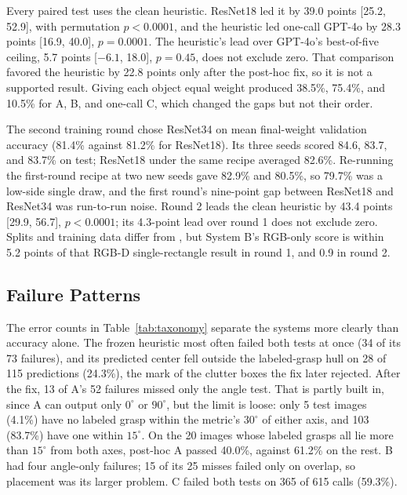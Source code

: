 \documentclass[10pt,conference,compsoc]{IEEEtran}
\begin{document}
Every paired test uses the clean heuristic. ResNet18 led it by 39.0 points
[25.2, 52.9], with permutation $p<0.0001$, and the heuristic led one-call
GPT-4o by 28.3 points [16.9, 40.0], $p=0.0001$. The heuristic's lead over
GPT-4o's best-of-five ceiling, 5.7 points [$-6.1$, 18.0], $p=0.45$, does
not exclude zero. That comparison favored the heuristic by 22.8 points only
after the post-hoc fix, so it is not a supported result. Giving each object
equal weight produced 38.5\%, 75.4\%, and 10.5\% for A, B, and one-call C,
which changed the gaps but not their order.

The second training round chose ResNet34 on mean final-weight validation
accuracy (81.4\% against 81.2\% for ResNet18). Its three seeds scored 84.6,
83.7, and 83.7\% on test; ResNet18 under the same recipe averaged 82.6\%.
Re-running the first-round recipe at two new seeds gave 82.9\% and 80.5\%,
so 79.7\% was a low-side single draw, and the first round's nine-point gap
between ResNet18 and ResNet34 was run-to-run noise. Round 2 leads the clean
heuristic by 43.4 points [29.9, 56.7], $p<0.0001$; its 4.3-point lead over
round 1 does not exclude zero. Splits and training data differ from
\cite{redmon2015}, but System B's RGB-only score is within 5.2 points of that
RGB-D single-rectangle result in round 1, and 0.9 in round 2.

\subsection{Failure Patterns}

The error counts in Table~\ref{tab:taxonomy} separate the systems more
clearly than accuracy alone. The frozen heuristic most often failed both
tests at once (34 of its 73 failures), and its predicted center fell outside
the labeled-grasp hull on 28 of 115 predictions (24.3\%), the mark of the
clutter boxes the fix later rejected. After the fix, 13 of A's 52 failures
missed only the angle test. That is partly built in, since A can output only
$0^\circ$ or $90^\circ$, but the limit is loose: only 5 test images (4.1\%)
have no labeled grasp within the metric's $30^\circ$ of either axis, and 103
(83.7\%) have one within $15^\circ$. On the 20 images whose labeled grasps
all lie more than $15^\circ$ from both axes, post-hoc A passed 40.0\%,
against 61.2\% on the rest. B had four angle-only failures; 15 of its 25
misses failed only on overlap, so placement was its larger problem. C failed
both tests on 365 of 615 calls (59.3\%).
\end{document}
